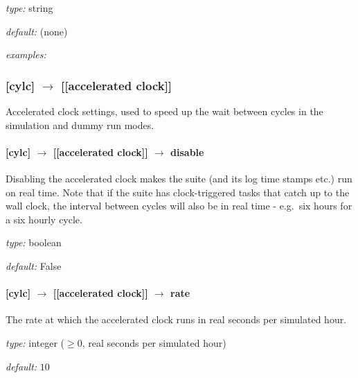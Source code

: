 \begin{myitemize}
    \item {\em type:} string
    \item {\em default:} (none)
    \item {\em examples:} 
\end{myitemize}

\subsubsection[{[[}accelerated clock{]]}]{[cylc] $\rightarrow$ [[accelerated clock]] }
\label{ClockConfig}

Accelerated clock settings, used to speed up the wait between cycles in
the simulation and dummy run modes. 

\paragraph[disable]{[cylc] $\rightarrow$ [[accelerated clock]] $\rightarrow$ disable}

Disabling the accelerated clock makes the suite (and its log time stamps
etc.) run on real time. Note that if the suite has clock-triggered tasks
that catch up to the wall clock, the interval between cycles will also be
in real time - e.g.\ six hours for a six hourly cycle.

\begin{myitemize}
    \item {\em type:} boolean 
    \item {\em default:} False
\end{myitemize}


\paragraph[rate]{[cylc] $\rightarrow$ [[accelerated clock]] $\rightarrow$ rate}

The rate at which the accelerated clock runs in real seconds per
simulated hour.

\begin{myitemize}
    \item {\em type:} integer ($$, real seconds per simulated hour)
    \item {\em default:} $10$
\end{myitemize}


